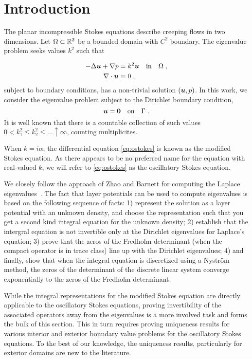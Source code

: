 \section{Introduction}

The planar incompressible Stokes equations describe
creeping flows in two dimensions. Let $\Omega \subset \mathbb{R}^2$
be a bounded domain with $C^2$ boundary. The eigenvalue problem seeks
values $k^2$ such that 

\begin{equation}
\begin{aligned}
  -\Delta {\boldsymbol u} + \nabla p &= k^2 {\boldsymbol u} \quad \textrm{in} \quad
  \Omega \label{eq:ostokes} \; , \\
  \nabla \cdot {\boldsymbol u} &= 0 \; ,
\end{aligned}
\end{equation}
subject to boundary conditions, has a non-trivial solution $({\boldsymbol u},p)$.
In this work, we consider the eigenvalue problem subject to 
the Dirichlet boundary condition,
\begin{equation}
  {\boldsymbol u} = {\boldsymbol 0} \quad \textrm{on} \quad \Gamma \label{eq:ostokes_dir} \; .
\end{equation}
It is well known that there is a countable collection of such
values $0 < k_{1}^{2} \leq k_{2}^2 \leq \ldots \uparrow \infty$,
counting multiplicites.

\begin{remark}
  When $k = i\alpha$, the differential equation
  \cref{eq:ostokes} is known as the modified Stokes
  equation. As there appears to be no preferred
  name for the equation with real-valued $k$,
  we will refer to \cref{eq:ostokes} as the
  oscillatory Stokes equation.
\end{remark}

We closely follow the approach of Zhao and Barnett
for computing the Laplace eigenvalues~\cite{zhao2015robust}.
%
The fact that layer potentials can be used to compute
eigenvalues is based on the following sequence of
facts: 1) represent the solution 
as a layer potential with 
an unknown density, and choose the representation such that
you get a second kind integral equation for the unknown density;
2) establish that the intergral equation is not invertible 
only at the Dirichlet eigenvalues for Laplace's equation;
3) prove that the zeros of the Fredholm determinant 
(when the compact operator is in trace class) 
line up with the Dirichlet eigenvalues; 
4) and finally, show that when the integral equation
is discretized using a Nystr\"{o}m method, the zeros of 
the determinant 
of the discrete linear system 
converge exponentially
to the zeros of the Fredholm determinant. 

%
While the integral representations for the modified
Stokes equation are directly applicable to the oscillatory
Stokes equations, 
proving invertibility of the associated operators
away from the eigenvalues is a more involved task
and forms the bulk of this section.
%
This in turn requires proving uniqueness results
for various interior and exterior boundary value problems
for the oscillatory Stokes equations.
%
To the best of our knowledge, the uniqueness results,
particularly
for exterior domains are new to the literature.


